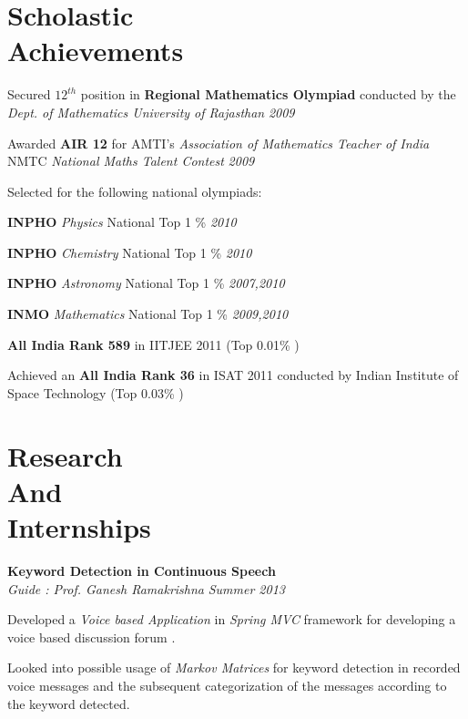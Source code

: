 \documentclass[margin,11pt]{resume}
\begin{document}
\begin{resume}

\vspace{25mm}

\section{\mysidestyle Scholastic\\Achievements}

\begin{list2}
\item Secured $12^{th}$ position in \textbf{Regional Mathematics Olympiad} conducted by the \emph{Dept. of Mathematics University of Rajasthan} \hfill \emph{2009}
\item Awarded \textbf{AIR 12} for AMTI's \emph{Association of Mathematics Teacher of India} NMTC \emph{National Maths Talent Contest} \hfill \emph{2009}
\item Selected for the following national olympiads:
\begin{list2}
\item \textbf{INPHO} \emph{Physics} National Top 1 \% \hfill \emph{2010}
\item \textbf{INPHO} \emph{Chemistry} National Top 1 \% \hfill \emph{2010}
\item \textbf{INPHO} \emph{Astronomy} National Top 1 \% \hfill \emph{2007,2010}
\item \textbf{INMO} \emph{Mathematics} National Top 1 \% \hfill \emph{2009,2010}
\end{list2}
\vspace{2mm}
\item \textbf{All India Rank 589} in IITJEE 2011 (Top 0.01\% )
\item Achieved an \textbf{All India Rank 36} in ISAT 2011 conducted by Indian Institute of Space Technology (Top 0.03\% )
\end{list2}\vspace{0.25mm}
\section{\mysidestyle Research\\And\\Internships }
\textbf{Keyword Detection in Continuous Speech} \\
    \textsl{Guide : Prof. Ganesh Ramakrishna} \hfill \emph{Summer 2013}
\begin{list2}
\item Developed a \emph{Voice based Application} in \emph{Spring MVC} framework for developing a voice based discussion forum . 
\item Looked into possible usage of \emph{Markov Matrices} for keyword detection in recorded voice messages and the subsequent categorization of the messages according to the keyword detected.
\end{list2}


\end{resume}
\end{document}

